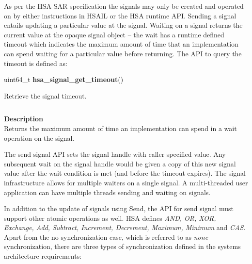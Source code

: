 \documentclass{book}
\newcommand{\hsadef}[2]{\hypertarget{#1}{\textbf{#2}}}
\newcommand{\hsatyp}[2]{\hypertarget{#1}{#2}}
\begin{document}
\vspace{3mm}As per the HSA SAR specification the signals may only be
created and operated on by either instructions in HSAIL or the HSA
runtime API.  Sending a signal entails updating a particular value at
the signal.  Waiting on a signal returns the current value at the
opaque signal object -- the wait has a runtime defined timeout which
indicates the maximum amount of time that an implementation can spend
waiting for a particular value before returning. The API to query the
timeout is defined as:

\makeatletter{}

\noindent\begin{tcolorbox}[nobeforeafter,colframe=white,colback=lightgray,left=0mm]
uint64\_t \hsadef{group__API__signal__timeout_1gac38679714c2c872fab1976efe1e3c021}{hsa\_signal\_get\_timeout}()

\end{tcolorbox}
Retrieve the signal timeout.

\noindent\begin{longtable}{@{}>{\hangindent=2em}p{\textwidth}}

\end{longtable}
\vspace{-5mm}\noindent\textbf{Returns}\\[1mm]
Signal timeout. The returned value is in the units of the system-wide clock whose frequency is available in \hsatyp{group__STR__platform_1gac15087b44d735fd1479fc754de556a00}{hsa\_platform\_t}.

\noindent\begin{longtable}{@{}>{\hangindent=2em}p{\linewidth}}

\end{longtable}
\vspace{-5mm}\noindent\textbf{Description}\\
Returns the maximum amount of time an implementation can spend in a wait operation on the signal. 
 

The send signal API sets the signal handle with caller specified
value. Any subsequent wait on the signal handle would be given
a copy of this new signal value after the wait condition
is met (and before the timeout expires).  The signal infrastructure
allows for multiple waiters on a single signal. A multi-threaded
user application can have multiple threads sending and waiting on
signals.

In addition to the update of signals using
Send, the API for send signal must support other atomic operations as
well. HSA defines \emph {AND, OR, XOR, Exchange, Add, Subtract,
Increment, Decrement, Maximum, Minimum} and \emph{CAS}. Apart from
the no synchronization case, which is referred to as \emph{none}
synchronization, there are three types of synchronization defined in
the systems architecture requirements:
\end{document}
